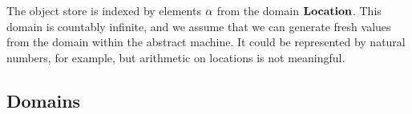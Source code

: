 \documentclass[a4paper,oneside]{article}
\begin{document}
The object store is indexed by elements $\alpha$ from the domain $\mathbf{Location}$.
This domain is countably infinite, and we assume that we can generate fresh values from the domain within the abstract machine.
It could be represented by natural numbers, for example, but arithmetic on locations is not meaningful.

\subsection{Domains}
\label{subsec:domains}

\newcommand{\expr}{\ensuremath{\mathit{E}}}
\newcommand{\expri}[1]{\expr_\ensuremath{\mathit{#1}}}
\newcommand{\exprs}{\expr\ensuremath{\mathit{s}}}

\newcommand{\stmt}{\ensuremath{\mathit{S}}}
\newcommand{\stmti}[1]{\stmt_\ensuremath{#1}}
\newcommand{\stmts}{\stmt\ensuremath{\mathit{s}}}

\newcommand{\handler}{\ensuremath{\mathit{H}}}
\newcommand{\strace}{\ensuremath{\textit{st}}}
\newcommand{\cstrace}{\ensuremath{\textit{cst}}}
\newcommand{\cex}{\ensuremath{\textit{cex}}}

\newcommand{\scase}{\mathit{SC}}
\newcommand{\scases}{\scase\ensuremath{\mathit{s}}}
\newcommand{\ccase}{\mathit{CC}}
\newcommand{\ccases}{\scase\ensuremath{\mathit{s}}}

\newcommand{\vals}{\ensuremath{vs}}
\newcommand{\env}{\ensuremath{\rho}}

\newcommand{\lbl}{\ensuremath{\textit{lbl}}}
\newcommand{\lbls}{\ensuremath{\textit{lbls}}}
\newcommand{\clbl}{\ensuremath{\textit{clbl}}}
\newcommand{\clbls}{\ensuremath{\textit{clbls}}}

\newcommand{\econt}{\cont_\ensuremath{E}}
\newcommand{\acont}{\cont_\ensuremath{A}}
\newcommand{\scont}{\cont_\ensuremath{S}}
\newcommand{\bcont}{\cont_\ensuremath{B}}
\newcommand{\switchcont}{\cont_{\ensuremath{\textit{switch}}}}

\newcommand{\funval}[3]{\mathrm{FunctionValue}({#1},\,{#2},\,{#3})}
\newcommand{\objval}{\mathrm{ObjectValue}(class, fields)}

\newcommand{\formal}{\ensuremath{A}}
\newcommand{\formali}[1]{\ensuremath{A_{#1}}}
\newcommand{\formals}{\ensuremath{As}}

\newcommand{\dexpr}{\mathbf{Expr}}
\newcommand{\dstmt}{\mathbf{Stmt}}
\newcommand{\dhandler}{\mathbf{Handler}}

\newcommand{\decont}{\mathbf{ExprCont}}
\newcommand{\dscont}{\mathbf{StmtCont}}
\newcommand{\dacont}{\mathbf{ApplCont}}
\newcommand{\dbcont}{\mathbf{BreakCont}}
\newcommand{\dswitchcont}{\mathbf{SwitchCont}}
\end{document}
